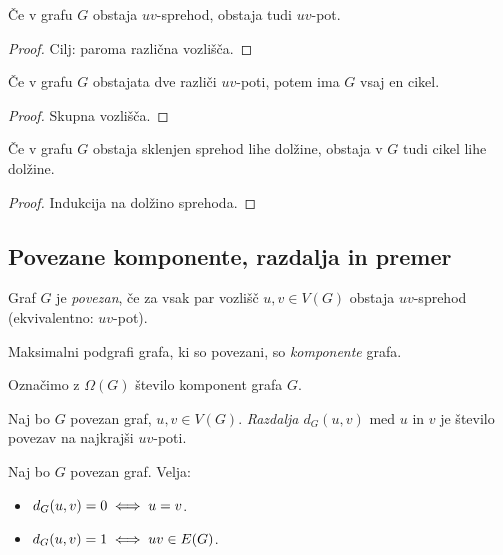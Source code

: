 \begin{lema}
    Če v grafu $G$ obstaja $uv$-sprehod, obstaja tudi $uv$-pot.
\end{lema}

\begin{proof}
    Cilj: paroma različna vozlišča.
\end{proof}

\begin{lema}
    Če v grafu $G$ obstajata dve različi $uv$-poti, potem ima $G$ vsaj en cikel.
\end{lema}

\begin{proof}
    Skupna vozlišča.
\end{proof}

\begin{lema}
    Če v grafu $G$ obstaja sklenjen sprehod lihe dolžine, obstaja v $G$ tudi cikel lihe dolžine.
\end{lema}

\begin{proof}
    Indukcija na dolžino sprehoda.
\end{proof}

\subsection{Povezane komponente, razdalja in premer}
\begin{definicija}
    Graf $G$ je \emph{povezan}, če za vsak par vozlišč $u, v \in V(G)$ obstaja $uv$-sprehod (ekvivalentno: $uv$-pot).
\end{definicija}

\begin{definicija}
    Maksimalni podgrafi grafa, ki so povezani, so \emph{komponente} grafa. 
\end{definicija}
Označimo z $\Omega(G)$ število komponent grafa $G$.

\begin{definicija}
    Naj bo $G$ povezan graf, $u, v \in V(G)$. \emph{Razdalja $d_G(u,v)$} med $u$ in $v$ je število povezav na najkrajši $uv$-poti.
\end{definicija}

\begin{opomba}
    Naj bo $G$ povezan graf. Velja:
    \begin{itemize}
        \item $d_G(u,v) = 0 \iff u = v$.
        \item $d_G(u,v) = 1 \iff uv \in E(G)$.
    \end{itemize}
\end{opomba}

